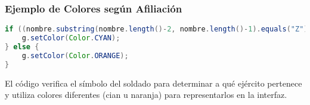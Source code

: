 \subsubsection{Ejemplo de Colores según Afiliación}
\begin{lstlisting}[language=Java]
if ((nombre.substring(nombre.length()-2, nombre.length()-1).equals("Z"))) {
    g.setColor(Color.CYAN);
} else {
    g.setColor(Color.ORANGE);
}
\end{lstlisting}
El código verifica el símbolo del soldado para determinar a qué ejército pertenece y utiliza colores diferentes (cian u naranja) para representarlos en la interfaz.
